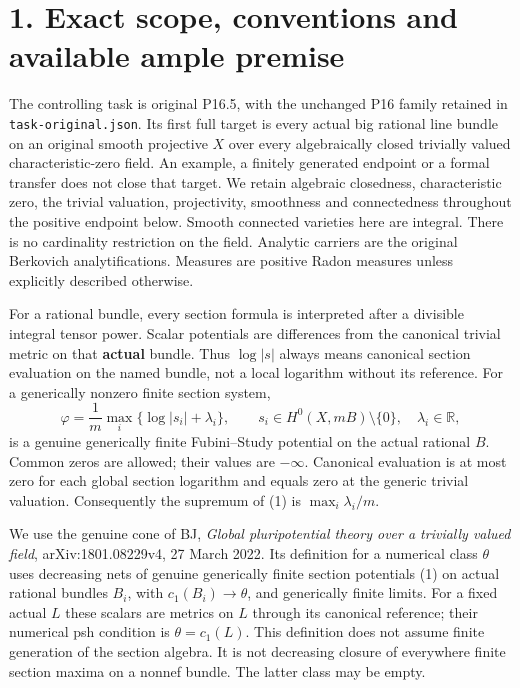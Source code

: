 \documentclass[
  10pt,
]{article}
\begin{document}
\section{1. Exact scope, conventions and available ample
premise}\label{exact-scope-conventions-and-available-ample-premise}

The controlling task is original P16.5, with the unchanged P16 family
retained in \texttt{task-original.json}. Its first full target is every
actual big rational line bundle on an original smooth projective \(X\)
over every algebraically closed trivially valued characteristic-zero
field. An example, a finitely generated endpoint or a formal transfer
does not close that target. We retain algebraic closedness,
characteristic zero, the trivial valuation, projectivity, smoothness and
connectedness throughout the positive endpoint below. Smooth connected
varieties here are integral. There is no cardinality restriction on the
field. Analytic carriers are the original Berkovich analytifications.
Measures are positive Radon measures unless explicitly described
otherwise.

For a rational bundle, every section formula is interpreted after a
divisible integral tensor power. Scalar potentials are differences from
the canonical trivial metric on that \textbf{actual} bundle. Thus
\(\log|s|\) always means canonical section evaluation on the named
bundle, not a local logarithm without its reference. For a generically
nonzero finite section system, \[
 \varphi=\frac1m\max_i\{\log|s_i|+\lambda_i\},\qquad
 s_i\in H^0(X,mB)\setminus\{0\},\quad\lambda_i\in\mathbb R,
 \tag{1}
\] is a genuine generically finite Fubini--Study potential on the actual
rational \(B\). Common zeros are allowed; their values are \(-\infty\).
Canonical evaluation is at most zero for each global section logarithm
and equals zero at the generic trivial valuation. Consequently the
supremum of (1) is \(\max_i\lambda_i/m\).

We use the genuine cone of BJ, \emph{Global pluripotential theory over a
trivially valued field}, arXiv:1801.08229v4, 27 March 2022. Its
definition for a numerical class \(\theta\) uses decreasing nets of
genuine generically finite section potentials (1) on actual rational
bundles \(B_i\), with \(c_1(B_i)\to\theta\), and generically finite
limits. For a fixed actual \(L\) these scalars are metrics on \(L\)
through its canonical reference; their numerical psh condition is
\(\theta=c_1(L)\). This definition does not assume finite generation of
the section algebra. It is not decreasing closure of everywhere finite
section maxima on a nonnef bundle. The latter class may be empty.
\end{document}
